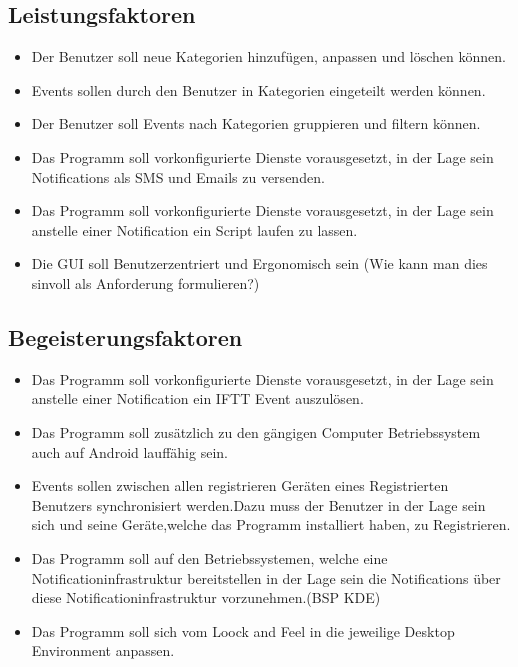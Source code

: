 \documentclass[11pt,titelpage]{scrreprt}
\begin{document}
\subsection{Leistungsfaktoren}
\begin{itemize}
\item
Der Benutzer soll neue Kategorien hinzufügen, anpassen und löschen können.
\item
Events sollen durch den Benutzer in Kategorien eingeteilt werden können.
\item
Der Benutzer soll Events nach Kategorien gruppieren und filtern können.
\item
Das Programm soll vorkonfigurierte Dienste vorausgesetzt, in der Lage sein Notifications als SMS und Emails zu versenden.
\item
Das Programm soll vorkonfigurierte Dienste vorausgesetzt, in der Lage sein anstelle einer Notification ein Script laufen zu lassen.
\item
Die GUI soll Benutzerzentriert und Ergonomisch sein (Wie kann man dies sinvoll als Anforderung formulieren?)
\end{itemize}

\subsection{Begeisterungsfaktoren}


\begin{itemize}
\item
Das Programm soll vorkonfigurierte Dienste vorausgesetzt, in der Lage sein anstelle einer Notification  ein IFTT Event auszulösen.

\item
Das Programm soll zusätzlich zu den gängigen Computer Betriebssystem auch auf Android lauffähig sein.

\item
Events sollen zwischen allen registrieren Geräten eines Registrierten Benutzers synchronisiert werden.Dazu muss der Benutzer in der Lage sein sich und seine Geräte,welche das Programm installiert haben, zu Registrieren.

\item
Das Programm soll auf den Betriebssystemen, welche eine Notificationinfrastruktur bereitstellen  in der Lage sein die Notifications über diese Notificationinfrastruktur vorzunehmen.(BSP KDE)

\item
Das Programm soll sich vom Loock and Feel in die jeweilige Desktop Environment anpassen.

\end{itemize}
\end{document}
